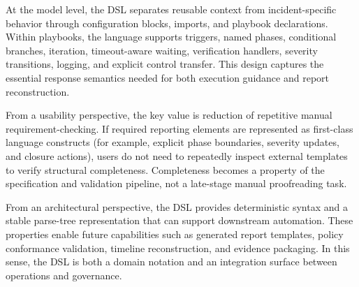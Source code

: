 At the model level, the DSL separates reusable context from incident-specific behavior through configuration blocks, imports, and playbook declarations. Within playbooks, the language supports triggers, named phases, conditional branches, iteration, timeout-aware waiting, verification handlers, severity transitions, logging, and explicit control transfer. This design captures the essential response semantics needed for both execution guidance and report reconstruction.

From a usability perspective, the key value is reduction of repetitive manual requirement-checking. If required reporting elements are represented as first-class language constructs (for example, explicit phase boundaries, severity updates, and closure actions), users do not need to repeatedly inspect external templates to verify structural completeness. Completeness becomes a property of the specification and validation pipeline, not a late-stage manual proofreading task.

From an architectural perspective, the DSL provides deterministic syntax and a stable parse-tree representation that can support downstream automation. These properties enable future capabilities such as generated report templates, policy conformance validation, timeline reconstruction, and evidence packaging. In this sense, the DSL is both a domain notation and an integration surface between operations and governance.
